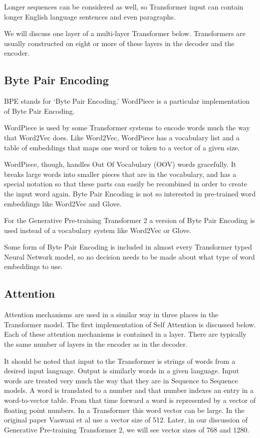 Longer sequences can be considered as well, so Transformer input can contain longer English language sentences and even paragraphs. 

We will discuss one layer of a multi-layer Transformer below. Transformers are usually constructed on eight or more of these layers in the decoder and the encoder.

\subsection{Byte Pair Encoding}

\ac{BPE} stands for `Byte Pair Encoding.' WordPiece is a particular implementation of Byte Pair Encoding.

WordPiece is used by some Transformer systems to encode words much the way that Word2Vec does. Like Word2Vec, WordPiece  has a vocabulary list and a table of embeddings that maps one word or token to a vector of a given size.

WordPiece, though, handles Out Of Vocabulary (\ac{OOV}) words gracefully. It breaks large words into smaller pieces that are in the vocabulary, and has a special notation so that these parts can easily be recombined in order to create the input word again. Byte Pair Encoding is not so interested in pre-trained word embeddings like Word2Vec and Glove.

For the Generative Pre-training Transformer 2 a version of Byte Pair Encoding is used instead of a vocabulary system like Word2Vec or Glove.

Some form of Byte Pair Encoding is included in almost every Transformer typed Neural Network model, so no decision needs to be made about what type of word embeddings to use.

\subsection{Attention}
Attention mechanisms are used in a similar way in three places in the Transformer model. The first implementation of Self Attention is discussed below. Each of these attention mechanisms is contained in a layer. There are typically the same number of layers in the encoder as in the decoder.

It should be noted that input to the Transformer is strings of words from a desired input language. Output is similarly words in a given language. Input words are treated very much the way that they are in Sequence to Sequence models. A word is translated to a number and that number indexes an entry in a word-to-vector table. From that time forward a word is represented by a vector of floating point numbers. In a Transformer this word vector can be large. In the original paper Vaswani et al \cite{Vaswani2017AttentionIA} use a vector size of 512. Later, in our discussion of Generative Pre-training Transformer 2, we will see vector sizes of 768 and 1280.

